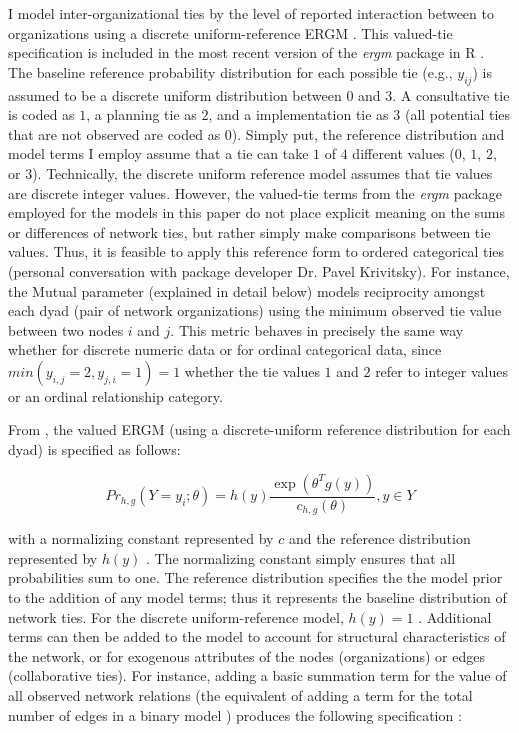 \documentclass[12pt,a4paper,titlepage]{article}
\begin{document}
I model inter-organizational ties by the level of reported interaction between to organizations using a discrete uniform-reference ERGM \parencite{krivitsky2013}. This valued-tie specification is included in the most recent version of the \textit{ergm} package in R \parencite{handcock2014}. The baseline reference probability distribution for each possible tie (e.g., $y_{ij}$) is assumed to be a discrete uniform distribution between $0$ and $3$. A consultative tie is coded as $1$, a planning tie as $2$, and a implementation tie as $3$ (all potential ties that are not observed are coded as $0$). Simply put, the reference distribution and model terms I employ assume that a tie can take $1$ of $4$ different values ($0$, $1$, $2$, or $3$). Technically, the discrete uniform reference model assumes that tie values are discrete integer values. However, the valued-tie terms from the \textit{ergm} package \parencite{handcock2014} employed for the models in this paper do not place explicit meaning on the sums or differences of network ties, but rather simply make comparisons between tie values. Thus, it is feasible to apply this reference form to ordered categorical ties (personal conversation with package developer Dr. Pavel Krivitsky). For instance, the Mutual parameter (explained in detail below) models reciprocity amongst each dyad (pair of network organizations) using the minimum observed tie value between two nodes $i$ and $j$. This metric behaves in precisely the same way whether for discrete numeric data or for ordinal categorical data, since $min(y_{i,j}=2,y_{j,i}=1)=1$ whether the tie values $1$ and $2$ refer to integer values or an ordinal relationship category. 

From \textcite{krivitsky2012}, the valued ERGM (using a discrete-uniform reference distribution for each dyad) is specified as follows:

\begin{equation}
Pr_{h,g}(Y=y_{i};\theta)= h(y) \frac{\exp(\theta^{T}g(y))}{c_{h,g}(\theta)}, y \in Y
\label{eq:ERGM}
\end{equation}

with a normalizing constant represented by $c$ and the reference distribution represented by $h(y)$ \parencite{krivitsky2013}. The normalizing constant simply ensures that all probabilities sum to one. The reference distribution specifies the the model prior to the addition of any model terms; thus it represents the baseline distribution of network ties. For the discrete uniform-reference model, $h(y) = 1$ \parencite{krivitsky2012}. Additional terms can then be added to the model to account for structural characteristics of the network, or for exogenous attributes of the nodes (organizations) or edges (collaborative ties). For instance, adding a basic summation term for the value of all observed network relations (the equivalent of adding a term for the total number of edges in a binary model \textcite{wyatt2010}) produces the following specification \parencite{krivitsky2013}:
\end{document}
